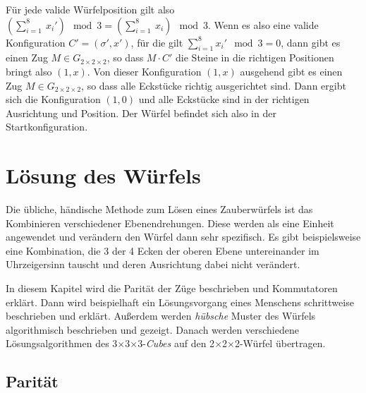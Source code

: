 \documentclass[12pt,a4paper, usenames, dvipsnames]{article}
\theoremstyle{mystyle}
\theoremstyle{definition}
\newcommand{\Gtwo}{\ensuremath{G_{2\times 2\times 2}}}
\newcommand{\Ttwo}{2$\times$2$\times$2-}
\newcommand{\Tthree}{3$\times$3$\times$3-}
\begin{document}
Für jede valide Würfelposition gilt also ${(\sum_{i = 1}^{8} \ x_i') \mod 3 = (\sum_{i = 1}^{8} \  x_i) \mod 3 }$. 
Wenn es also eine valide Konfiguration $C'=(\sigma', x')$, für die gilt $\sum_{i = 1}^{8} x_i' \mod 3 = 0$, dann gibt es einen Zug $M \in \Gtwo$, so dass $M \cdot C'$ die Steine in die richtigen Positionen bringt also $(1,x)$. 
Von dieser Konfiguration $(1,x)$ ausgehend gibt es einen Zug $M \in \Gtwo$, so dass alle Eckstücke richtig ausgerichtet sind. Dann ergibt sich die Konfiguration $(1, 0)$ und alle Eckstücke sind in der richtigen Ausrichtung und Position. Der Würfel befindet sich also in der Startkonfiguration. 
%
%
%
%
%
%
%
%
%
%
%
%
%
%
%
%
%
%
%
%
\newpage


\section{Lösung des Würfels}

Die übliche, händische Methode zum Lösen eines Zauberwürfels ist das Kombinieren verschiedener Ebenendrehungen. Diese werden als eine Einheit angewendet und verändern den Würfel dann sehr spezifisch. 
Es gibt beispielsweise eine Kombination, die 3 der 4 Ecken der oberen Ebene untereinander im Uhrzeigersinn tauscht und deren Ausrichtung dabei nicht verändert. 

In diesem Kapitel wird die Parität der Züge beschrieben und Kommutatoren erklärt.
Dann wird beispielhaft ein Lösungsvorgang eines Menschens schrittweise beschrieben und erklärt.
Außerdem werden \textit{hübsche} Muster des Würfels algorithmisch beschrieben und gezeigt.
Danach werden verschiedene Lösungsalgorithmen des \Tthree \textit{Cubes} auf den \Ttwo Würfel übertragen.

%
%
%
%
%
%
%
%
%
%
%
%
%
%
%
%
%
%
%
%
\subsection*{Parität}
\end{document}
